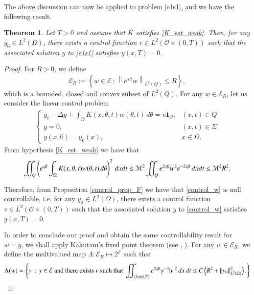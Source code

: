 \documentclass[preprint,1p]{elsarticle}
\newcommand{\D}{\displaystyle}
\newcommand{\norm}[2]{\left\|#1\right\|_{#2}}
\newcommand{\intd}{\displaystyle\int \kern -7pt \int}
\newtheorem{theorem}{\bf Theorem}[section]
\begin{document}
The above discussion can now be applied to problem \eqref{e1s1}, and we have the following result.
%
\begin{theorem}\label{control_thm2} 
Let $T>0$ and assume that $K$ satisfies \eqref{K_est_weak}. Then, for any $y_0\in L^2(\Omega)$, there exists a control function $v\in L^2(\mathcal O\times(0,T))$ such that the associated solution $y$ to \eqref{e1s1} satisfies $y(x,T) = 0$.	
\end{theorem}	
%
\begin{proof}
For $R>0$, we define 
\begin{align*}
	\mathcal E_R:=\left\{ w\in\mathcal E\,:\, \norm{e^{s\beta}w}{L^2(Q)}\leq R\right\},
\end{align*}
which is a bounded, closed and convex subset of $L^2(Q)$. For any $w\in\mathcal E_R$, let us consider the linear control problem 
\begin{align}\label{control_w}
	\begin{cases}
		\D y_t - \Delta y + \int_\Omega K(x,\theta,t)w(\theta,t)\,d\theta = v\mathbf{1}_{\mathcal O}, & (x,t)\in Q
		\\
		y = 0, & (x,t)\in\Sigma
		\\
		y(x,0) = y_0(x), & x\in\Omega.
	\end{cases}
\end{align}	
From hypothesis \eqref{K_est_weak} we have that
\begin{align*}
	\intd_Q\left(e^{s\beta}\int_\Omega K(x,\theta,t)w(\theta,t)\,d\theta\right)^2\,dxdt \leq \mathcal M^2\intd_Q e^{2s\beta}w^2e^{-2s\beta}\,dxdt \leq \mathcal M^2R^2.
\end{align*}

Therefore, from Proposition \ref{control_prop_F} we have that \eqref{control_w} is null controllable, i.e. for any $y_0\in L^2(\Omega)$, there exists a control function $v\in L^2(\mathcal O\times(0,T))$ such that the associated solution $y$ to \eqref{control_w} satisfies $y(x,T) = 0$. 

In order to conclude our proof and obtain the same controllability result for $w=y$, we shall apply Kakutani's fixed point theorem (see \cite[Theorem 2.3]{fernandez2006global}, \cite{kakutani1941generalization}). For any $w\in \mathcal E_R$, we define the multivalued map $\Lambda: \mathcal E_R\mapsto 2^{\mathcal E}$ such that
\begin{align*}
	\Lambda(w) = \left\{y\,:\,y\in\mathcal E \textrm{ and there exists } v \textrm{ such that }	\intd_{\mathcal O\times(0,T)} e^{2s\beta}\gamma^{-3} |v|^2\,dx\,dt \leq C \left(R^2 + \norm{y_0}{L^2(\Omega)}^2\right). \right\}
\end{align*} 	


\end{proof}
\end{document}
